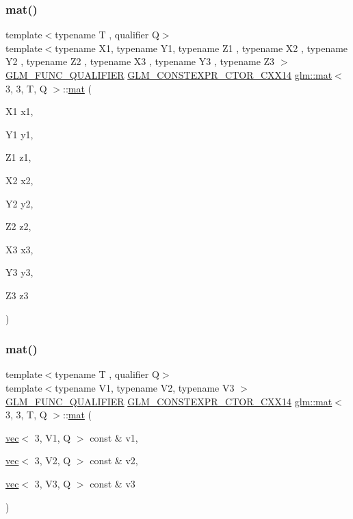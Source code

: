 \subsubsection{\texorpdfstring{mat()}{mat()}\hspace{0.1cm}{\footnotesize\ttfamily [19/21]}}
{\footnotesize\ttfamily template$<$typename T , qualifier Q$>$ \\
template$<$typename X1, typename Y1, typename Z1 , typename X2 , typename Y2 , typename Z2 , typename X3 , typename Y3 , typename Z3 $>$ \\
\hyperlink{setup_8hpp_a33fdea6f91c5f834105f7415e2a64407}{G\+L\+M\+\_\+\+F\+U\+N\+C\+\_\+\+Q\+U\+A\+L\+I\+F\+I\+ER} \hyperlink{setup_8hpp_a0900f9145e68bf6061b6f5e7be3fa751}{G\+L\+M\+\_\+\+C\+O\+N\+S\+T\+E\+X\+P\+R\+\_\+\+C\+T\+O\+R\+\_\+\+C\+X\+X14} \hyperlink{structglm_1_1mat}{glm\+::mat}$<$ 3, 3, T, Q $>$\+::\hyperlink{structglm_1_1mat}{mat} (\begin{DoxyParamCaption}\item[{X1}]{x1,  }\item[{Y1}]{y1,  }\item[{Z1}]{z1,  }\item[{X2}]{x2,  }\item[{Y2}]{y2,  }\item[{Z2}]{z2,  }\item[{X3}]{x3,  }\item[{Y3}]{y3,  }\item[{Z3}]{z3 }\end{DoxyParamCaption})}

\mbox{\label{structglm_1_1mat_3_013_00_013_00_01_t_00_01_q_01_4_a4795e853feaed2593cdee9e041da1f58}} 
\subsubsection{\texorpdfstring{mat()}{mat()}\hspace{0.1cm}{\footnotesize\ttfamily [20/21]}}
{\footnotesize\ttfamily template$<$typename T , qualifier Q$>$ \\
template$<$typename V1, typename V2, typename V3 $>$ \\
\hyperlink{setup_8hpp_a33fdea6f91c5f834105f7415e2a64407}{G\+L\+M\+\_\+\+F\+U\+N\+C\+\_\+\+Q\+U\+A\+L\+I\+F\+I\+ER} \hyperlink{setup_8hpp_a0900f9145e68bf6061b6f5e7be3fa751}{G\+L\+M\+\_\+\+C\+O\+N\+S\+T\+E\+X\+P\+R\+\_\+\+C\+T\+O\+R\+\_\+\+C\+X\+X14} \hyperlink{structglm_1_1mat}{glm\+::mat}$<$ 3, 3, T, Q $>$\+::\hyperlink{structglm_1_1mat}{mat} (\begin{DoxyParamCaption}\item[{\hyperlink{structglm_1_1vec}{vec}$<$ 3, V1, Q $>$ const \&}]{v1,  }\item[{\hyperlink{structglm_1_1vec}{vec}$<$ 3, V2, Q $>$ const \&}]{v2,  }\item[{\hyperlink{structglm_1_1vec}{vec}$<$ 3, V3, Q $>$ const \&}]{v3 }\end{DoxyParamCaption})}

